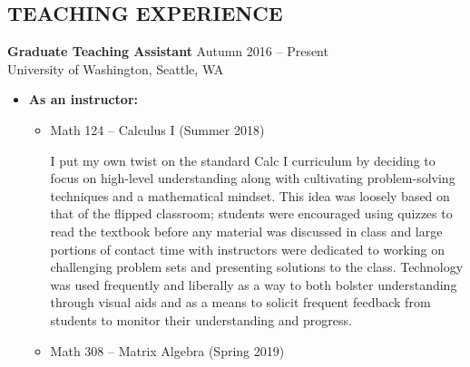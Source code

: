 \documentclass[margin]{res} %
\begin{document}
\begin{resume}
\newpage
 
\section{TEACHING EXPERIENCE}

{\bf Graduate Teaching Assistant} \hfill Autumn 2016 -- Present \\
University of Washington, Seattle, WA

\begin{itemize} \itemsep -1pt %
\item\textbf{As an instructor:} 
\begin{itemize}
	\item Math 124 -- Calculus I (Summer 2018)\vspace{5pt}

	I put my own twist on the standard Calc I curriculum by deciding to focus on high-level understanding along with cultivating problem-solving techniques and a mathematical mindset.
	This idea was loosely based on that of the flipped classroom; students were encouraged using quizzes to read the textbook before any material was discussed in class and large portions of contact time with instructors were dedicated to working on challenging problem sets and presenting solutions to the class.
	Technology was used frequently and liberally as a way to both bolster understanding through visual aids and as a means to solicit frequent feedback from students to monitor their understanding and progress.\vspace{5pt}
	\item Math 308 -- Matrix Algebra (Spring 2019)\vspace{5pt}
	

\end{itemize}
\end{itemize}
\end{resume}
\end{document}
